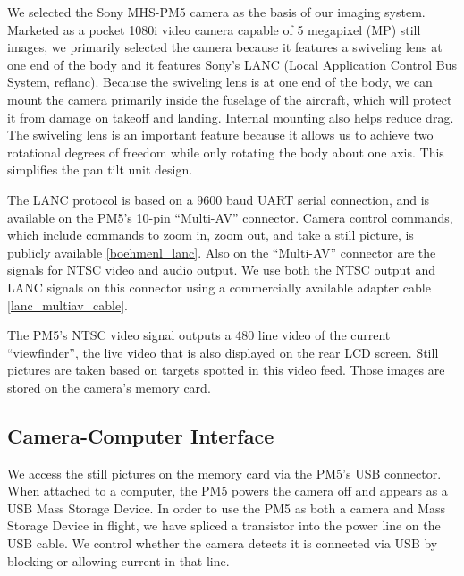\documentclass[10pt]{report}
\begin{document}
We selected the Sony MHS-PM5 camera as the basis of our imaging system. Marketed as a pocket 1080i video camera capable of 5 megapixel (MP) still images, we primarily selected the camera because it features a swiveling lens at one end of the body and it features Sony's LANC (Local Application Control Bus System, ref{lanc}). Because the swiveling lens is at one end of the body, we can mount the camera primarily inside the fuselage of the aircraft, which will protect it from damage on takeoff and landing. Internal mounting also helps reduce drag. The swiveling lens is an important feature because it allows us to achieve two rotational degrees of freedom while only rotating the body about one axis. This simplifies the pan tilt unit design.

The LANC protocol is based on a 9600 baud UART serial connection, and is available on the PM5's 10-pin ``Multi-AV'' connector. Camera control commands, which include commands to zoom in, zoom out, and take a still picture, is publicly available \ref{boehmenl_lanc}. Also on the ``Multi-AV'' connector are the signals for NTSC video and audio output. We use both the NTSC output and LANC signals on this connector using a commercially available adapter cable \ref{lanc_multiav_cable}.


The PM5's NTSC video signal outputs a 480 line video of the current ``viewfinder'', the live video that is also displayed on the rear LCD screen. 
Still pictures are taken based on targets spotted in this video feed. Those images are stored on the camera's memory card.


\subsection{Camera-Computer Interface}

We access the still pictures on the memory card via the PM5's USB connector. When attached to a computer, the PM5 powers the camera off and appears as a USB Mass Storage Device. In order to use the PM5 as both a camera and Mass Storage Device in flight, we have spliced a transistor into the power line on the USB cable. We control whether the camera detects it is connected via USB by blocking or allowing current in that line. 
\end{document}
